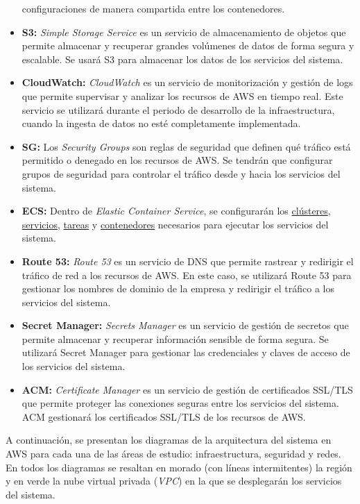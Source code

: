 \begin{itemize}
		configuraciones de manera compartida entre los contenedores.
	\item \textbf{S3:} \textit{Simple Storage Service} es un servicio de
		almacenamiento de objetos que permite almacenar y recuperar grandes
		volúmenes de datos de forma segura y escalable. Se usará S3 para
		almacenar los datos de los servicios del sistema.
	\item \textbf{CloudWatch:} \textit{CloudWatch} es un servicio de
		monitorización y gestión de logs que permite supervisar y analizar los
		recursos de AWS en tiempo real. Este servicio se utilizará durante el
		periodo de desarrollo de la infraestructura, cuando la ingesta de datos
		no esté completamente implementada.
	\item \textbf{SG:} Los \textit{Security Groups} son reglas de seguridad que
		definen qué tráfico está permitido o denegado en los recursos de AWS.
		Se tendrán que configurar grupos de seguridad para controlar el tráfico
		desde y hacia los servicios del sistema.
	\item \textbf{ECS:} Dentro de \textit{Elastic Container Service}, se
		configurarán los \underline{clústeres}, \underline{servicios},
		\underline{tareas} y \underline{contenedores} necesarios para
		ejecutar los servicios del sistema.
	\item \textbf{Route 53:} \textit{Route 53} es un servicio de DNS que permite
		rastrear y redirigir el tráfico de red a los recursos de AWS. En este
		caso, se utilizará Route 53 para gestionar los nombres de dominio de la
		empresa y redirigir el tráfico a los servicios del sistema.
	\item \textbf{Secret Manager:} \textit{Secrets Manager} es un servicio de
		gestión de secretos que permite almacenar y recuperar información
		sensible de forma segura. Se utilizará Secret Manager para
		gestionar las credenciales y claves de acceso de los servicios del
		sistema.
	\item \textbf{ACM:} \textit{Certificate Manager} es un servicio de gestión
		de certificados SSL/TLS que permite proteger las conexiones seguras
		entre los servicios del sistema. ACM gestionará los certificados SSL/TLS
		de los recursos de AWS.
\end{itemize}

A continuación, se presentan los diagramas de la arquitectura del sistema en AWS
para cada una de las áreas de estudio: infraestructura, seguridad y redes. En
todos los diagramas se resaltan en morado (con líneas intermitentes) la región y
en verde la nube virtual privada (\textit{VPC}) en la que se desplegarán los
servicios del sistema.


